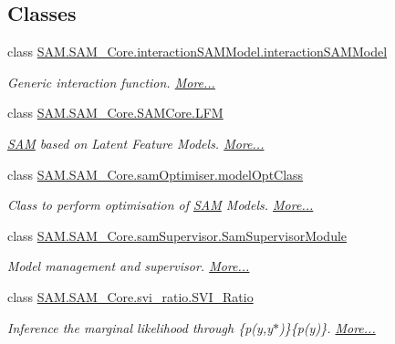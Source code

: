 \subsection*{Classes}
\begin{DoxyCompactItemize}
\item 
class \hyperlink{group__icubclient__SAM__Core_classSAM_1_1SAM__Core_1_1interactionSAMModel_1_1interactionSAMModel}{S\+A\+M.\+S\+A\+M\+\_\+\+Core.\+interaction\+S\+A\+M\+Model.\+interaction\+S\+A\+M\+Model}
\begin{DoxyCompactList}\small\item\em Generic interaction function.  \hyperlink{group__icubclient__SAM__Core_classSAM_1_1SAM__Core_1_1interactionSAMModel_1_1interactionSAMModel}{More...}\end{DoxyCompactList}\item 
class \hyperlink{group__icubclient__SAM__Core_classSAM_1_1SAM__Core_1_1SAMCore_1_1LFM}{S\+A\+M.\+S\+A\+M\+\_\+\+Core.\+S\+A\+M\+Core.\+L\+FM}
\begin{DoxyCompactList}\small\item\em \hyperlink{namespaceSAM}{S\+AM} based on Latent Feature Models.  \hyperlink{group__icubclient__SAM__Core_classSAM_1_1SAM__Core_1_1SAMCore_1_1LFM}{More...}\end{DoxyCompactList}\item 
class \hyperlink{group__icubclient__SAM__Core_classSAM_1_1SAM__Core_1_1samOptimiser_1_1modelOptClass}{S\+A\+M.\+S\+A\+M\+\_\+\+Core.\+sam\+Optimiser.\+model\+Opt\+Class}
\begin{DoxyCompactList}\small\item\em Class to perform optimisation of \hyperlink{namespaceSAM}{S\+AM} Models.  \hyperlink{group__icubclient__SAM__Core_classSAM_1_1SAM__Core_1_1samOptimiser_1_1modelOptClass}{More...}\end{DoxyCompactList}\item 
class \hyperlink{group__icubclient__SAM__Core_classSAM_1_1SAM__Core_1_1samSupervisor_1_1SamSupervisorModule}{S\+A\+M.\+S\+A\+M\+\_\+\+Core.\+sam\+Supervisor.\+Sam\+Supervisor\+Module}
\begin{DoxyCompactList}\small\item\em Model management and supervisor.  \hyperlink{group__icubclient__SAM__Core_classSAM_1_1SAM__Core_1_1samSupervisor_1_1SamSupervisorModule}{More...}\end{DoxyCompactList}\item 
class \hyperlink{group__icubclient__SAM__Core_classSAM_1_1SAM__Core_1_1svi__ratio_1_1SVI__Ratio}{S\+A\+M.\+S\+A\+M\+\_\+\+Core.\+svi\+\_\+ratio.\+S\+V\+I\+\_\+\+Ratio}
\begin{DoxyCompactList}\small\item\em Inference the marginal likelihood through \{p(y,y$\ast$)\}\{p(y)\}.  \hyperlink{group__icubclient__SAM__Core_classSAM_1_1SAM__Core_1_1svi__ratio_1_1SVI__Ratio}{More...}\end{DoxyCompactList}\end{DoxyCompactItemize}
